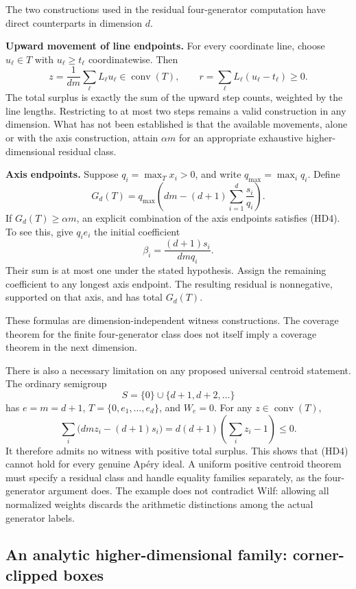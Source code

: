 \documentclass[
  11pt,
  a4paper,
]{article}
\begin{document}
The two constructions used in the residual four-generator computation
have direct counterparts in dimension \(d\).

\textbf{Upward movement of line endpoints.} For every coordinate line,
choose \(u_\ell\in T\) with \(u_\ell\ge t_\ell\) coordinatewise. Then \[
z=\frac1{dm}\sum_\ell L_\ell u_\ell\in\operatorname{conv}(T),
\qquad
r=\sum_\ell L_\ell(u_\ell-t_\ell)\ge0.
\tag{HD7}
\] The total surplus is exactly the sum of the upward step counts,
weighted by the line lengths. Restricting to at most two steps remains a
valid construction in any dimension. What has not been established is
that the available movements, alone or with the axis construction,
attain \(\alpha m\) for an appropriate exhaustive higher-dimensional
residual class.

\textbf{Axis endpoints.} Suppose \(q_i=\max_Tx_i>0\), and write
\(q_{\max}=\max_iq_i\). Define \[
G_d(T)=q_{\max}\left(dm-(d+1)\sum_{i=1}^d\frac{s_i}{q_i}\right).
\tag{HD8}
\] If \(G_d(T)\ge\alpha m\), an explicit combination of the axis
endpoints satisfies (HD4). To see this, give \(q_i e_i\) the initial
coefficient \[
\beta_i=\frac{(d+1)s_i}{dmq_i}.
\] Their sum is at most one under the stated hypothesis. Assign the
remaining coefficient to any longest axis endpoint. The resulting
residual is nonnegative, supported on that axis, and has total
\(G_d(T)\).

These formulas are dimension-independent witness constructions. The
coverage theorem for the finite four-generator class does not itself
imply a coverage theorem in the next dimension.

There is also a necessary limitation on any proposed universal centroid
statement. The ordinary semigroup \[
S=\{0\}\cup\{d+1,d+2,\ldots\}
\] has \(e=m=d+1\), \(T=\{0,e_1,\ldots,e_d\}\), and \(W_e=0\). For any
\(z\in\operatorname{conv}(T)\), \[
\sum_i\bigl(dmz_i-(d+1)s_i\bigr)
=d(d+1)\left(\sum_i z_i-1\right)\le0.
\] It therefore admits no witness with positive total surplus. This
shows that (HD4) cannot hold for every genuine Apéry ideal. A uniform
positive centroid theorem must specify a residual class and handle
equality families separately, as the four-generator argument does. The
example does not contradict Wilf: allowing all normalized weights
discards the arithmetic distinctions among the actual generator labels.

\hypertarget{an-analytic-higher-dimensional-family-corner-clipped-boxes}{%
\subsection{An analytic higher-dimensional family: corner-clipped
boxes}\label{an-analytic-higher-dimensional-family-corner-clipped-boxes}}
\end{document}
